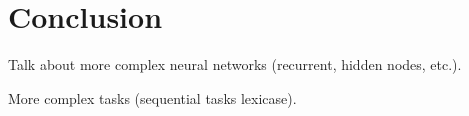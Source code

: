 \section{Conclusion}
\label{sec:conclusion}

Talk about more complex neural networks (recurrent, hidden nodes, etc.).

More complex tasks (sequential tasks lexicase).
